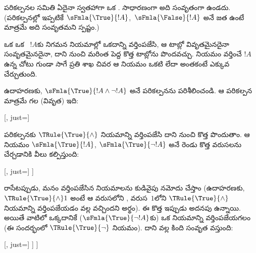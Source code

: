 \documentclass[../../../include/open-logic-section]{subfiles}
\begin{document}
\begin{ex}
  పరికల్పనల సమితి ఏదైనా స్వతహాగా ఒక . సాధారణంగా
  అది సంవృతంగా ఉండదు. (పరికల్పనల్లో ఇప్పటికే
  $\sFmla{\True}{!A}$,~$\sFmla{\False}{!A}$ అనే 
  జత ఉంటే మాత్రమే అది సంవృతమని స్పష్టం.)

  ఒక  ఒక ~$!A$కు నిగమన
  నియమాల్లో ఒకదాన్ని వర్తింపజేసి, ఆ టాబ్లో వివృతమైనదైనా
  సంవృతమైనదైనా, దాని నుంచి మరింత పెద్ద కొత్త టాబ్లోను
  పొందవచ్చు. నియమం వర్తించే $!A$ ఉన్న చోటు గుండా సాగే
  ప్రతి శాఖ చివర ఆ నియమం ఒకటి లేదా అంతకంటే ఎక్కువ
   చేర్చుతుంది.

  ఉదాహరణకు, $\sFmla{\True}{!A \land \lnot !A}$ అనే పరికల్పనను
  పరిశీలించండి. ఆ పరికల్పన మాత్రమే గల (వివృత)  ఇది:
  \begin{center}
    \begin{tableau}{}
      [, just=\TAss]
    \end{tableau}{}
  \end{center}
  పరికల్పనకు $\TRule{\True}{\land}$ నియమాన్ని వర్తింపజేసి దాని నుంచి
  కొత్త  పొందుతాం. ఆ నియమం 
  $\sFmla{\True}{!A}$, $\sFmla{\True}{\lnot !A}$ అనే రెండు కొత్త
  వరుసలను చేర్చడానికి వీలు కల్పిస్తుంది:
  \begin{center}
    \begin{tableau}{}
      [, just=\TAss
        [\sFmla{\True}{\formula{A}}, just={\TRule{\True}{\land}[1]},
          [\sFmla{\True}{\lnot \formula{A}}, just={\TRule{\True}{\land}[1]}
          ]
        ]
      ]
    \end{tableau}{}
  \end{center}
   రాసేటప్పుడు, మనం వర్తింపజేసిన నియమాలను కుడివైపు
  నమోదు చేస్తాం (ఉదాహరణకు, $\TRule{\True}{\land} 1$ అంటే ఆ వరుసలోని
  , వరుస~$1$లోని 
  $\TRule{\True}{\land}$ నియమాన్ని వర్తింపజేయడం వల్ల వచ్చిందని
  అర్థం). ఈ కొత్త  ఇప్పుడు అదనపు 
  ఉన్నాయి. అయితే వాటిలో ఒక్కదానికే ($\sFmla{\True}{\lnot !A}$కు)
  ఒక నియమాన్ని వర్తింపజేయగలం (ఈ సందర్భంలో
  $\TRule{\True}{\lnot}$ నియమం). దాని వల్ల కింది సంవృత
   వస్తుంది:
  \begin{center}
    \begin{tableau}{}
      [, just=\TAss
        [\sFmla{\True}{\formula{A}}, just={\TRule{\True}{\land}[1]}
          [\sFmla{\True}{\lnot \formula{A}}, just={\TRule{\True}{\land}[1]}
            [\sFmla{\False}{\formula{A}}, just={\TRule{\True}{\lnot}[3]}, close]
          ]
        ]
      ]
    \end{tableau}{}
  \end{center}
\end{ex}
\end{document}
